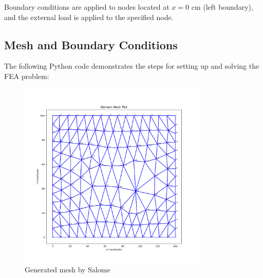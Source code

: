 \documentclass[12pt]{report}
\begin{document}
Boundary conditions are applied to nodes located at \(x = 0\) cm (left boundary), and the external load is applied to the specified node.

\subsection{Mesh and Boundary Conditions}
The following Python code demonstrates the steps for setting up and solving the FEA problem:

\begin{figure}[H]
	\centering
	\includegraphics[width=0.8\textwidth]{mesh.png} %
	\caption{Generated mesh by Salome}
	\label{fig:generated mesh}
\end{figure}
\end{document}
